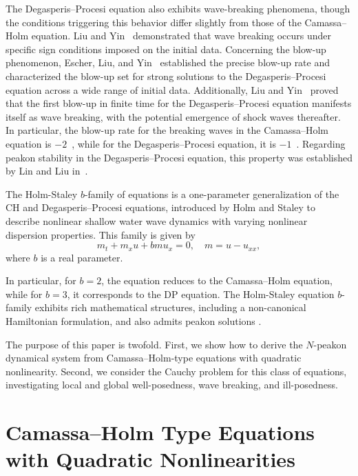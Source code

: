 \documentclass[11pt]{article}
\begin{document}
The Degasperis–Procesi equation also exhibits wave-breaking phenomena, though the conditions triggering this behavior differ
slightly from those of the Camassa–Holm equation. Liu and Yin~\cite{liu2006global} demonstrated that wave breaking occurs
under specific sign conditions imposed on the initial data. Concerning the blow-up phenomenon, Escher, Liu, and
Yin~\cite{escher2006global} established the precise blow-up rate and characterized the blow-up set for strong
solutions to the Degasperis–Procesi equation across a wide range of initial data. Additionally, Liu and Yin~\cite{liu2006global} proved
that the first blow-up in finite time for the Degasperis–Procesi equation manifests itself as wave breaking, with the potential emergence
of shock waves thereafter. In particular, the blow-up rate for the breaking waves in the Camassa–Holm equation is
$-2$~\cite{constantin2000existence}, while for the Degasperis–Procesi equation, it is $-1$~\cite{escher2006global}. Regarding
peakon stability in the Degasperis–Procesi equation, this property was established by Lin and Liu in~\cite{lin2009stability}.


The Holm-Staley \( b \)-family of equations is a one-parameter generalization of the CH and Degasperis–Procesi equations, introduced
by Holm and Staley \cite{holm2003nonlinear} to describe nonlinear shallow water wave dynamics with varying
nonlinear dispersion properties. This family is given by
\begin{equation}
m_t  + m_xu  + bmu_x = 0,\quad m = u - u_{xx},
\end{equation}
where \( b \) is a real parameter.

In particular, for \( b = 2 \), the equation reduces to the Camassa–Holm equation, while for \( b = 3 \), it corresponds to the DP
equation. The Holm-Staley equation \( b \)-family exhibits rich mathematical structures, including a non-canonical
Hamiltonian formulation, and also admits peakon solutions \cite{degasperis2003integrable}.

The purpose of this paper is twofold. First, we show how to derive the $N$-peakon dynamical system from Camassa--Holm-type equations with quadratic nonlinearity. Second, we consider the Cauchy problem for this class of equations, investigating local and global well-posedness, wave breaking, and ill-posedness.

\section{Camassa--Holm Type Equations with Quadratic Nonlinearities}
\end{document}
